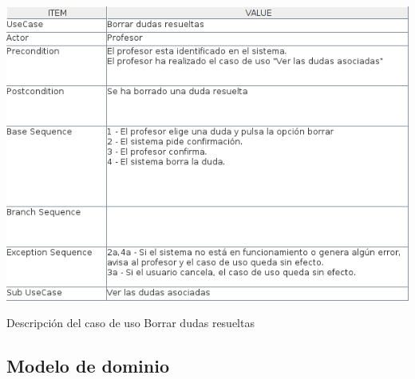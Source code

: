 \documentclass[openright,twoside,10pt]{book}
\begin{document}
    \vspace*{\fill}
    
    \newpage
    
    \vspace*{\fill}
    
    \begin{table}[H]
        \begin{center}
            \includegraphics[width=\textwidth]{img/astah/analisis/casos_de_uso/useCase16.png}
        \end{center}
        \caption{Descripción del caso de uso Borrar dudas resueltas}
    \end{table}
    
    \vspace*{\fill} \newpage
    
    \subsection{Modelo de dominio}\label{modelo-de-dominio}
    
    \vspace*{\fill}
    
\end{document}
